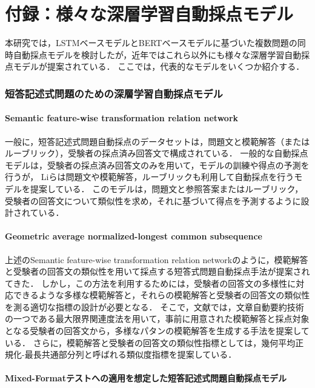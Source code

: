 \documentclass[a4paper,12pt,oneside,openany]{jsbook}
\begin{document}
%
%
\chapter*{付録：様々な深層学習自動採点モデル}

本研究では，LSTMベースモデルとBERTベースモデルに基づいた複数問題の同時自動採点モデルを検討したが，近年ではこれら以外にも様々な深層学習自動採点モデルが提案されている．
ここでは，代表的なモデルをいくつか紹介する．

\subsection*{短答記述式問題のための深層学習自動採点モデル}\label{sec:other_asag}

\subsubsection*{Semantic feature-wise transformation relation network}

一般に，短答記述式問題自動採点のデータセットは，問題文と模範解答（またはルーブリック），受験者の採点済み回答文で構成されている．
一般的な自動採点モデルは，受験者の採点済み回答文のみを用いて，モデルの訓練や得点の予測を行うが，
Liら\cite{ASAG_SFRN}は問題文や模範解答，ルーブリックも利用して自動採点を行うモデルを提案している．
このモデルは，問題文と参照答案またはルーブリック，受験者の回答文について類似性を求め，それに基づいて得点を予測するように設計されている．

\subsubsection*{Geometric average normalized-longest common subsequence}

上述のSemantic feature-wise transformation relation networkのように，模範解答と受験者の回答文の類似性を用いて採点する短答式問題自動採点手法が提案されてきた．
しかし，この方法を利用するためには，受験者の回答文の多様性に対応できるような多様な模範解答と，それらの模範解答と受験者の回答文の類似性を測る適切な指標の設計が必要となる．
そこで，文献\cite{asag11}では，文章自動要約技術の一つである最大限界関連度法を用いて，事前に用意された模範解答と採点対象となる受験者の回答文から，多様なパタンの模範解答を生成する手法を提案している．
さらに，模範解答と受験者の回答文の類似性指標としては，幾何平均正規化-最長共通部分列と呼ばれる類似度指標を提案している．

\subsubsection*{Mixed-Formatテストへの適用を想定した短答記述式問題自動採点モデル}
\end{document}

